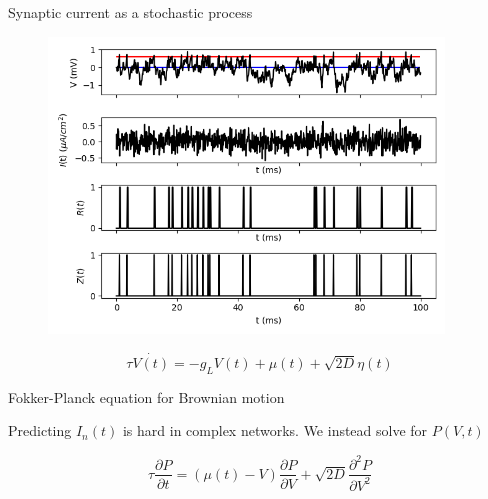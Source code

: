 \documentclass[aspectratio=169]{beamer}
\begin{document}
\begin{frame}{Synaptic current as a stochastic process}


\begin{figure}
\centering
\includegraphics[width=105mm]{figure-23}
\end{figure}

\begin{equation*}
\tau\dot{V(t)} = -g_{L}V(t) + \mu(t) + \sqrt{2D}\eta(t)
\end{equation*}

\end{frame}


\begin{frame}{Fokker-Planck equation for Brownian motion}

\begin{figure}
\centering
{}
\end{figure}

Predicting $I_{n}(t)$ is hard in complex networks. We instead solve for $P(V,t)$

\begin{equation*}
\tau\frac{\partial P}{\partial t} = (\mu(t)-V)\frac{\partial P}{\partial V} + \sqrt{2D}\frac{\partial^{2}P}{\partial V^{2}}
\end{equation*}

\end{frame}
\end{document}
